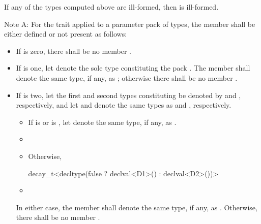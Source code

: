 If any of the types computed above are ill-formed, then
 is ill-formed.


\pnum
Note A: For the  trait applied to a parameter pack
 of types, the member  shall be either defined or not
present as follows:

\begin{itemize}
\item If  is zero, there shall be no member .

\item If  is one, let  denote the sole type
constituting the pack .
The member   shall denote the same
type, if any, as ;
otherwise there shall be no member .

\item If  is two,
let the first and second types constituting  be denoted
by  and , respectively, and
let  and  denote
the same types as  and , respectively.
  \begin{itemize}
  \item If  is  or
      is ,
     let  denote the same type, if any, as .

  \item

  \item Otherwise,  
\begin{codeblock}
decay_t<decltype(false ? declval<D1>() : declval<D2>())>
\end{codeblock}

  \item {}
  \end{itemize}
In either case, the member   shall denote
the same type, if any, as .
Otherwise, there shall be no member .


\end{itemize}
